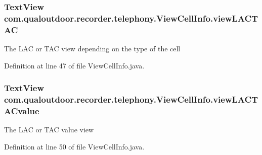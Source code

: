\hypertarget{classcom_1_1qualoutdoor_1_1recorder_1_1telephony_1_1ViewCellInfo_addba4df5e73bb65b7b9ab54e340b3a6a}{
\subsubsection[{view\-L\-A\-C\-T\-A\-C}]{\setlength{\rightskip}{0pt plus 5cm}Text\-View com.\-qualoutdoor.\-recorder.\-telephony.\-View\-Cell\-Info.\-view\-L\-A\-C\-T\-A\-C\hspace{0.3cm}{\ttfamily [private]}}}\label{classcom_1_1qualoutdoor_1_1recorder_1_1telephony_1_1ViewCellInfo_addba4df5e73bb65b7b9ab54e340b3a6a}
The L\-A\-C or T\-A\-C view depending on the type of the cell 

Definition at line 47 of file View\-Cell\-Info.\-java.

\hypertarget{classcom_1_1qualoutdoor_1_1recorder_1_1telephony_1_1ViewCellInfo_af75d362066657bc8f00af69cb1a4b4dc}{
\subsubsection[{view\-L\-A\-C\-T\-A\-Cvalue}]{\setlength{\rightskip}{0pt plus 5cm}Text\-View com.\-qualoutdoor.\-recorder.\-telephony.\-View\-Cell\-Info.\-view\-L\-A\-C\-T\-A\-Cvalue\hspace{0.3cm}{\ttfamily [private]}}}\label{classcom_1_1qualoutdoor_1_1recorder_1_1telephony_1_1ViewCellInfo_af75d362066657bc8f00af69cb1a4b4dc}
The L\-A\-C or T\-A\-C value view 

Definition at line 50 of file View\-Cell\-Info.\-java.


